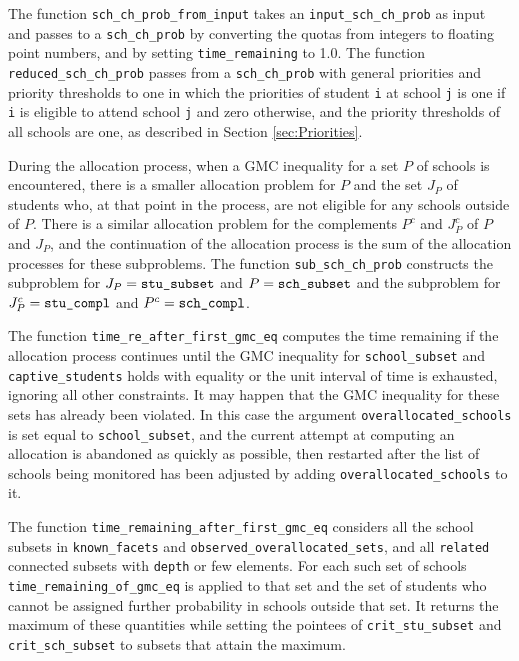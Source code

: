 \documentclass[12pt]{article}
\theoremstyle{definition}
\begin{document}
\begin{appendix}
The function \texttt{sch\_ch\_prob\_from\_input} takes an
\texttt{input\_sch\_ch\_prob} as input and passes to a
\texttt{sch\_ch\_prob} by converting the quotas from integers to
floating point numbers, and by setting \texttt{time\_remaining} to
1.0.  The function \texttt{reduced\_sch\_ch\_prob} passes from a
\texttt{sch\_ch\_prob} with general priorities and priority thresholds
to one in which the priorities of student \texttt{i} at school
\texttt{j} is one if \texttt{i} is eligible to attend school
\texttt{j} and zero otherwise, and the priority thresholds of all
schools are one, as described in Section \ref{sec:Priorities}.

During the allocation process, when a GMC inequality for a set $P$ of
schools is encountered, there is a smaller allocation problem for $P$
and the set $J_P$ of students who, at that point in the process, are
not eligible for any schools outside of $P$.  There is a similar
allocation problem for the complements $P^c$ and $J_P^c$ of $P$ and
$J_P$, and the continuation of the allocation process is the sum of
the allocation processes for these subproblems.  The function
\texttt{sub\_sch\_ch\_prob} constructs the subproblem for $J_P =
\text{\texttt{stu\_subset}}$ and $P = \text{\texttt{sch\_subset}}$ and
the subproblem for $J_P^c = \text{\texttt{stu\_compl}}$ and $P^c =
\text{\texttt{sch\_compl}}$.  

The function \texttt{time\_re\_after\_first\_gmc\_eq} computes the time
remaining if the allocation process continues until the GMC inequality
for \texttt{school\_subset} and \texttt{captive\_students} holds with
equality or the unit interval of time is exhausted, ignoring all other
constraints.  It may happen that the GMC inequality for these sets has
already been violated.  In this case the argument
\texttt{overallocated\_schools} is set equal to
\texttt{school\_subset}, and the current attempt at computing an
allocation is abandoned as quickly as possible, then restarted after
the list of schools being monitored has been adjusted by adding
\texttt{overallocated\_schools} to it.

The function \texttt{time\_remaining\_after\_first\_gmc\_eq} considers
all the school subsets in \texttt{known\_facets} and
\texttt{observed\_overallocated\_sets}, and all \texttt{related}
connected subsets with \texttt{depth} or few elements.  For each such
set of schools \texttt{time\_remaining\_of\_gmc\_eq} is applied to
that set and the set of students who cannot be assigned further
probability in schools outside that set.  It returns the maximum of
these quantities while setting the pointees of
\texttt{crit\_stu\_subset} and \texttt{crit\_sch\_subset} to subsets
that attain the maximum.


\end{appendix}
\end{document}

